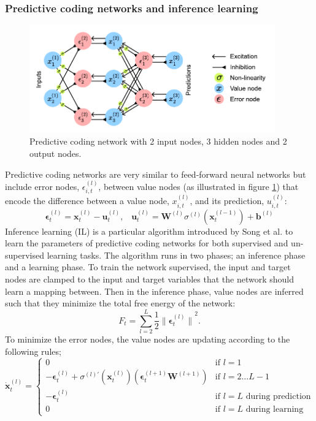 \documentclass[a4paper,11pt]{article}
\begin{document}
\subsubsection{Predictive coding networks and inference learning}
\begin{figure}
  \centering
  \includegraphics[width=300pt]{graphics/predictive-coding-network.pdf}
  \caption{Predictive coding network with 2 input nodes, 3 hidden nodes and 2 output nodes.}
  \label{fig:predictive-coding-network}
\end{figure}
Predictive coding networks are very similar to feed-forward neural networks but include error nodes, $\epsilon_{i,t}^{(l)}$, between value nodes (as illustrated in figure \ref{fig:predictive-coding-network}) that encode the difference between a value node, $x_{i,t}^{(l)}$, and its prediction, $u_{i,t}^{(l)}$:
\begin{equation} \label{eq:pc-error-nodes-and-preds}
  \mathbf{\epsilon}_t^{(l)} = \mathbf{x}_t^{(l)} - \mathbf{u}_t^{(l)},\hspace{10pt}  \mathbf{u}_t^{(l)} = \mathbf{W}^{(l)} \sigma^{(l)}(\mathbf{x}_t^{(l-1)}) + \mathbf{b}^{(l)}
\end{equation}
 Inference learning (IL) is a particular algorithm introduced by Song et al. \cite{PredictiveCodingNetworks} to learn the parameters of predictive coding networks for both supervised and un-supervised learning tasks. The algorithm runs in two phases; an inference phase and a learning phase. To train the network supervised, the input and target nodes are clamped to the input and target variables that the network should learn a mapping between. Then in the inference phase, value nodes are inferred such that they minimize the total free energy of the network:
\begin{equation}
  F_t = \sum_{l=2}^{L}{
    \frac{1}{2}{\lVert \mathbf{\epsilon}_t^{(l)} \rVert}^2.
  }
\end{equation}
To minimize the error nodes, the value nodes are updating according to the following rules;
\begin{equation} \label{eq:update-value-nodes}
  \dot{\mathbf{x}}_t^{(l)} = \begin{cases}
    0 & \text{if } l=1 \\
     -\mathbf{\epsilon}_t^{(l)} + \sigma^{(l)\prime}(\mathbf{x}_t^{(l)}) ( \mathbf{\epsilon}_t^{(l+1)} \mathbf{W}^{(l+1)} )  & \text{if } l = 2 \ldots L-1 \\
    - \mathbf{\epsilon}_t^{(l)} & \text {if } l = L \text{ during prediction} \\
    0 & \text {if } l = L \text{ during learning}
  \end{cases}
\end{equation}
\end{document}
